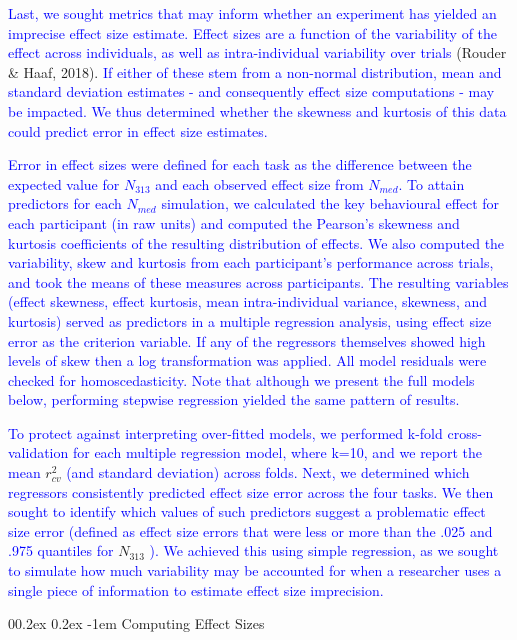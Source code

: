 \documentclass[
  man]{apa6}
\makeatletter
\let\oldparagraph\paragraph
\renewcommand{\paragraph}[1]{\oldparagraph{#1}\mbox{}}
\renewcommand{\paragraph}{\@startsection{paragraph}{4}{\parindent}%
  {0\baselineskip \@plus 0.2ex \@minus 0.2ex}%
  {-1em}%
  {\normalfont\normalsize\bfseries\itshape\typesectitle}}
\makeatother
\begin{document}
\textcolor{blue}{Last, we sought metrics that may inform whether an experiment has yielded an imprecise effect size estimate. Effect sizes are a function of the variability of the effect across individuals, as well as intra-individual variability over trials} (Rouder \& Haaf, 2018). \textcolor{blue}{If either of these stem from a non-normal distribution, mean and standard deviation estimates - and consequently effect size computations - may be impacted. We thus determined whether the skewness and kurtosis of this data could predict error in effect size estimates.}

\textcolor{blue}{Error in effect sizes were defined for each task as the difference between the expected value for $N_{313}$ and each observed effect size from $N_{med}$. To attain predictors for each $N_{med}$ simulation, we calculated the key behavioural effect for each participant (in raw units) and computed the Pearson's skewness and kurtosis coefficients of the resulting distribution of effects. We also computed the variability, skew and kurtosis from each participant's performance across trials, and took the means of these measures across participants. The resulting variables (effect skewness, effect kurtosis, mean intra-individual variance, skewness, and kurtosis) served as predictors in a multiple regression analysis, using effect size error as the criterion variable. If any of the regressors themselves showed high levels of skew then a log transformation was applied. All model residuals were checked for homoscedasticity. Note that although we present the full models below, performing stepwise regression yielded the same pattern of results.}

\textcolor{blue}{To protect against interpreting over-fitted models, we performed k-fold cross-validation for each multiple regression model, where k=10, and we report the mean} \(r_{cv}^2\) \textcolor{blue}{ (and standard deviation) across folds. Next, we determined which regressors consistently predicted effect size error across the four tasks. We then sought to identify which values of such predictors suggest a problematic effect size error (defined as effect size errors that were less or more than the .025 and .975 quantiles for} \(N_{313}\) \textcolor{blue}{). We achieved this using simple regression, as we sought to simulate how much variability may be accounted for when a researcher uses a single piece of information to estimate effect size imprecision.}

\hypertarget{computing-effect-sizes}{%
\paragraph{Computing Effect Sizes}\label{computing-effect-sizes}}
\end{document}
